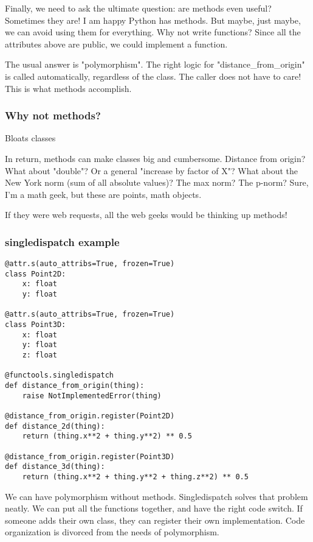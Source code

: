 Finally,
we need to ask the ultimate question:
are methods even useful?
Sometimes they are!
I am happy Python has methods.
But maybe,
just maybe,
we can avoid using them for everything.
Why not write functions?
Since all the attributes above are public,
we could implement a function.

The usual answer is "polymorphism".
The right logic for "distance_from_origin" is called automatically,
regardless of the class.
The caller does not have to care!
This is what methods accomplish.

\begin{frame}[fragile]
\frametitle{Why not methods?}

Bloats classes

\end{frame}

In return,
methods can make classes big and cumbersome.
Distance from origin?
What about "double"?
Or a general "increase by factor of X"?
What about the New York norm
(sum of all absolute values)?
The max norm?
The p-norm?
Sure,
I'm a math geek,
but these are points,
math objects.

If they were web requests,
all the web geeks would be thinking up methods!

\begin{frame}[fragile]
\frametitle{singledispatch example}

\begin{lstlisting}
@attr.s(auto_attribs=True, frozen=True)
class Point2D:
    x: float
    y: float

@attr.s(auto_attribs=True, frozen=True)
class Point3D:
    x: float
    y: float
    z: float

@functools.singledispatch
def distance_from_origin(thing):
    raise NotImplementedError(thing)

@distance_from_origin.register(Point2D)
def distance_2d(thing):
    return (thing.x**2 + thing.y**2) ** 0.5

@distance_from_origin.register(Point3D)
def distance_3d(thing):
    return (thing.x**2 + thing.y**2 + thing.z**2) ** 0.5
\end{lstlisting}

\end{frame}

We can have polymorphism without methods.
Singledispatch solves that problem neatly.
We can put all the functions together,
and have the right code switch.
If someone adds their own class,
they can register their own implementation.
Code organization is divorced from the needs
of polymorphism.

